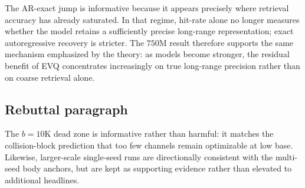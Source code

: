 The AR-exact jump is informative because it appears precisely where retrieval accuracy has already saturated. In that regime, hit-rate alone no longer measures whether the model retains a sufficiently precise long-range representation; exact autoregressive recovery is stricter. The \(750\mathrm{M}\) result therefore supports the same mechanism emphasized by the theory: as models become stronger, the residual benefit of EVQ concentrates increasingly on true long-range precision rather than on coarse retrieval alone.

\subsection{Rebuttal paragraph}

The \(b=10\mathrm{K}\) dead zone is informative rather than harmful: it matches the collision-block prediction that too few channels remain optimizable at low base. Likewise, larger-scale single-seed runs are directionally consistent with the multi-seed body anchors, but are kept as supporting evidence rather than elevated to additional headlines.
